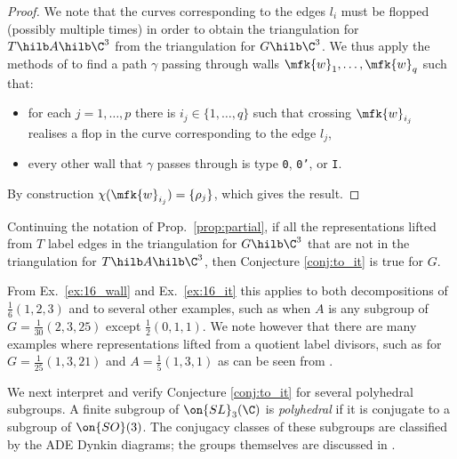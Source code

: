 \documentclass[leqno,11pt,a4paper]{amsart}
\begin{document}
\begin{proof} We note that the curves corresponding to the edges $l_i$ must be flopped (possibly multiple times) in order to obtain the triangulation for $T\hilb A\hilb\C^3$ from the triangulation for $G\hilb\C^3$. We thus apply the methods of \cite[\S8]{ci_flo_04} to find a path $\gamma$ passing through walls $\mfk{w}_1,\dots,\mfk{w}_q$ such that:
\begin{itemize}
\item for each $j=1,\dots,p$ there is $i_j\in\{1,\dots,q\}$ such that crossing $\mfk{w}_{i_j}$ realises a flop in the curve corresponding to the edge $l_j$,
\item every other wall that $\gamma$ passes through is type \texttt{0}, \texttt{0'}, or \texttt{I}.
\end{itemize}
By construction $\chi(\mfk{w}_{i_j})=\{\rho_j\}$, which gives the result.
\end{proof}

\begin{cor} Continuing the notation of Prop.~\ref{prop:partial}, if all the representations lifted from $T$ label edges in the triangulation for $G\hilb\C^3$ that are not in the triangulation for $T\hilb A\hilb\C^3$, then Conjecture \ref{conj:to_it} is true for $G$.
\end{cor}

From Ex.~\ref{ex:16_wall} and Ex.~\ref{ex:16_it} this applies to both decompositions of $\frac{1}{6}(1,2,3)$ and to several other examples, such as when $A$ is any subgroup of $G=\frac{1}{30}(2,3,25)$ except $\frac{1}{2}(0,1,1)$. We note however that there are many examples where representations lifted from a quotient label divisors, such as for $G=\frac{1}{25}(1,3,21)$ and $A=\frac{1}{5}(1,3,1)$ as can be seen from \cite[Fig.~29]{wor_wal_20}.

We next interpret and verify Conjecture \ref{conj:to_it} for several polyhedral subgroups. A finite subgroup of $\on{SL}_3(\C)$ is \emph{polyhedral} if it is conjugate to a subgroup of $\on{SO}(3)$. The conjugacy classes of these subgroups are classified by the ADE Dynkin diagrams; the groups themselves are discussed in \cite[\S2]{ns_flo_17}.
\end{document}
